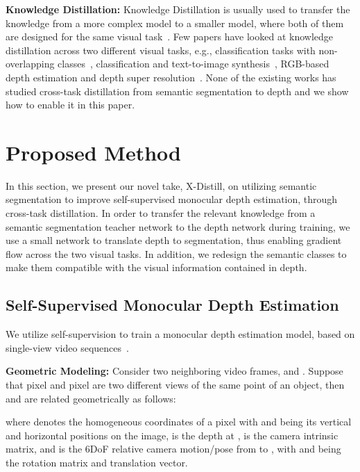 \documentclass{bmvc2k}
\newcommand{\rev}{}
\begin{document}
\noindent \textbf{Knowledge Distillation:} 
Knowledge Distillation is usually used to transfer the knowledge from a more complex model to a smaller model, where both of them are designed for the same visual task~\cite{gou2021knowledge}. Few papers have looked at knowledge distillation across two different visual tasks, e.g., classification tasks with non-overlapping classes~\cite{ye2020distilling}, classification and text-to-image synthesis~\cite{yuan2019ckd}, RGB-based depth estimation and depth super resolution~\cite{sun2021learning}. None of the existing works has studied cross-task distillation from semantic segmentation to depth and we show how to enable it in this paper.

\vspace{-12pt}
\section{Proposed Method}\label{sec:method}
\vspace{-8pt}
In this section, we present our novel take, X-Distill, on utilizing semantic segmentation to improve self-supervised monocular depth estimation, through cross-task distillation. In order to transfer the relevant knowledge from a semantic segmentation teacher network to the depth network during training, we use a small network to translate depth to segmentation, thus enabling gradient flow across the two visual tasks. In addition, we redesign the semantic classes to make them compatible with the visual information contained in depth.

\vspace{-10pt}
\subsection{Self-Supervised Monocular Depth Estimation}\label{sec:ssmde}
\vspace{-5pt}
We utilize self-supervision to train a monocular depth estimation model, based on single-view video sequences~\cite{godard2019digging,zhou2017unsupervised}. 

\noindent \textbf{Geometric Modeling:} Consider two neighboring video frames,  and . Suppose that pixel  and pixel  are two different views of the same point of an object, then  and  are related geometrically as follows:\vspace{-7pt}

\rev{where  denotes the homogeneous coordinates of a pixel  with  and  being its vertical and horizontal positions on the image,  is the depth at ,  is the camera intrinsic matrix, and  is the 6DoF relative camera motion/pose from  to , with  and  being the rotation matrix and translation vector. }
\end{document}
